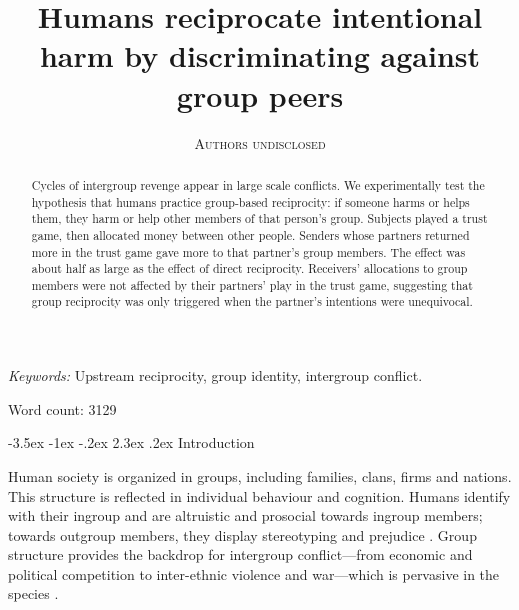 \documentclass[12pt,a4paper]{article}\usepackage[]{graphicx}\usepackage[]{color}
\title{\bf\sffamily Humans reciprocate intentional harm by discriminating against group peers}
\author{\textsc{Authors undisclosed}}
\date{}%
\makeatletter
\renewcommand\section{\@startsection {section}{1}{\z@}%
{-3.5ex \@plus -1ex \@minus -.2ex}%
{2.3ex \@plus.2ex}%
{\bf\sffamily\Large}}
\makeatother
\begin{document}
\maketitle

\begin{abstract}
Cycles of intergroup revenge appear in large scale conflicts. We experimentally
test the hypothesis that humans practice group-based reciprocity: if someone
harms or helps them, they harm or help other members of that person's group.
Subjects played a trust game, then allocated money between other people. Senders
whose partners returned more in the trust game gave more to that partner's group
members. The effect was about half as large as the effect of direct reciprocity.
Receivers' allocations to group members were not affected by their partners’ 
play in the trust game, suggesting that group reciprocity was only triggered when the
partner's intentions were unequivocal.
\end{abstract}

\emph{Keywords:} Upstream reciprocity, group identity, intergroup conflict.

Word count: 3129



\newpage

\section{Introduction}

Human society is organized in groups, including families, clans, firms and nations. This
structure is reflected in individual behaviour and cognition. Humans identify
with their ingroup and are altruistic and prosocial towards ingroup members;
towards outgroup members, they display stereotyping and prejudice
\citep{tajfel1979integrative,yamagishi2000thegroup,balliet2014ingroup,DeDreu2014,chen2009group,chen2011potential}.
Group structure provides the backdrop for intergroup conflict---from economic
and political competition to inter-ethnic violence and war---which is pervasive
in the species \citep{world_bank_world_2011}.
\end{document}
